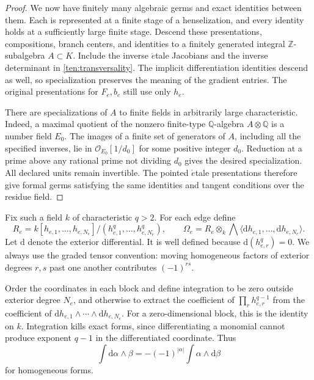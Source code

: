 \begin{proof}
We now have finitely many algebraic germs and exact identities between
them.  Each is represented at a finite stage of a henselization, and every
identity holds at a sufficiently large finite stage.  Descend these
presentations, compositions, branch centers, and identities to a finitely
generated integral \(\mathbb Z\)-subalgebra \(A\subset K\).  Include the
inverse \(\acute{e}\)tale Jacobians and the inverse determinant in
\eqref{ten:transversality}.  The implicit differentiation identities
descend as well, so specialization preserves the meaning of the gradient
entries.  The original presentations for \(F_e,b_e\) still use only
\(h_e\).

There are specializations of \(A\) to finite fields in arbitrarily large
characteristic.  Indeed, a maximal quotient of the nonzero finite-type
\(\mathbb Q\)-algebra \(A\otimes\mathbb Q\) is a number field \(E_0\).
The images of a finite set of generators of \(A\), including all the
specified inverses, lie in \(\mathcal O_{E_0}[1/d_0]\) for some positive
integer \(d_0\).  Reduction at a prime above any rational prime not
dividing \(d_0\) gives the desired specialization.  All declared units
remain invertible.  The pointed \(\acute{e}\)tale presentations therefore
give formal germs satisfying the same identities and tangent conditions
over the residue field.
\end{proof}

Fix such a field \(k\) of characteristic \(q>2\).  For each edge define
\[
 R_e=k[h_{e,1},\ldots,h_{e,N_e}]/
                    (h_{e,1}^q,\ldots,h_{e,N_e}^q),
 \qquad
 \Omega_e=R_e\otimes_k
             \bigwedge\langle \mathrm dh_{e,1},\ldots,
                                      \mathrm dh_{e,N_e}\rangle .
\]
Let \(\mathrm d\) denote the exterior differential.  It is well defined
because \(\mathrm d(h_{e,r}^q)=0\).  We always use the graded tensor
convention: moving homogeneous factors of exterior degrees \(r,s\) past
one another contributes \((-1)^{rs}\).

Order the coordinates in each block and define integration to be zero
outside exterior degree \(N_e\), and otherwise to extract the coefficient
of \(\prod_r h_{e,r}^{q-1}\) from the coefficient of
\(\mathrm dh_{e,1}\wedge\cdots\wedge\mathrm dh_{e,N_e}\).
For a zero-dimensional block, this is the identity on \(k\).  Integration
kills exact forms, since differentiating a monomial cannot produce
exponent \(q-1\) in the differentiated coordinate.  Thus
\begin{equation}\label{ten:integration-parts}
 \int\mathrm d\alpha\wedge\beta
       =-(-1)^{|\alpha|}\int\alpha\wedge\mathrm d\beta
\end{equation}
for homogeneous forms.

